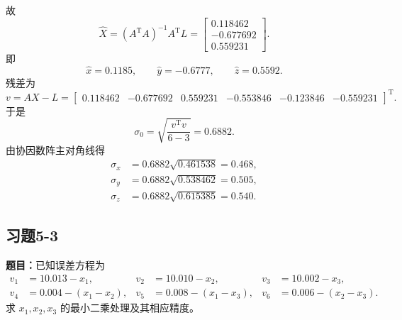 \documentclass[UTF8,zihao=-4]{ctexart}
\newcommand{\problem}[1]{\subsection*{#1}}
\newcommand{\timu}{\noindent\textbf{题目：}}
\begin{document}
{故
\begin{equation*}
    \hat{X}=(A^{\mathrm T}A)^{-1}A^{\mathrm T}L
    =\begin{bmatrix}0.118462\\-0.677692\\0.559231\end{bmatrix}.
\end{equation*}
即
\begin{equation*}
    \hat{x}=0.1185,
    \qquad
    \hat{y}=-0.6777,
    \qquad
    \hat{z}=0.5592.
\end{equation*}
残差为
\begin{equation*}
    v=AX-L=\begin{bmatrix}
    0.118462&-0.677692&0.559231&-0.553846&-0.123846&-0.559231
    \end{bmatrix}^{\mathrm T}.
\end{equation*}
于是
\begin{equation*}
    \sigma_0=\sqrt{\frac{v^{\mathrm T}v}{6-3}}=0.6882.
\end{equation*}
由协因数阵主对角线得
\begin{equation*}
\begin{aligned}
    \sigma_x&=0.6882\sqrt{0.461538}=0.468,\\
    \sigma_y&=0.6882\sqrt{0.538462}=0.505,\\
    \sigma_z&=0.6882\sqrt{0.615385}=0.540.
\end{aligned}
\end{equation*}

\problem{习题5-3}
\timu 已知误差方程为
\begin{equation*}
\begin{aligned}
    v_1&=10.013-x_1,          & v_2&=10.010-x_2,          & v_3&=10.002-x_3,\\
    v_4&=0.004-(x_1-x_2),     & v_5&=0.008-(x_1-x_3),     & v_6&=0.006-(x_2-x_3).
\end{aligned}
\end{equation*}
求 $x_1,x_2,x_3$ 的最小二乘处理及其相应精度。

}
\end{document}
